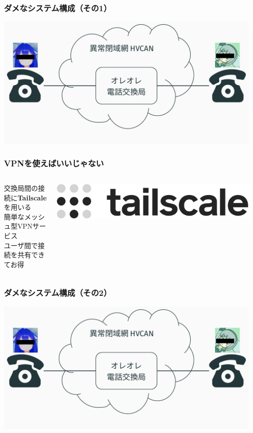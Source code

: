 \documentclass[
  lualatex,
  aspectratio=169,
  14pt
]{beamer}
\begin{document}
\begin{frame}
  \frametitle{ダメなシステム構成（その1）}

  \includegraphics[page=2,width=\linewidth]{./images/pictures.pdf}
\end{frame}

\begin{frame}
  \frametitle{VPNを使えばいいじゃない}

  \begin{columns}
    \begin{column}{.6\textwidth}
      交換局間の接続に\textbf{Tailscale}を用いる\\
      \hspace{1.5\zw}簡単なメッシュ型VPNサービス\\
      \hspace{1.5\zw}ユーザ間で接続を共有できてお得
    \end{column}
    \begin{column}{.39\textwidth}
      \includegraphics[width=\linewidth]{./images/tailscale.png}
    \end{column}
  \end{columns}
\end{frame}

\begin{frame}
  \frametitle{ダメなシステム構成（その2）}

  \includegraphics[page=3,width=\linewidth]{./images/pictures.pdf}
\end{frame}
\end{document}
